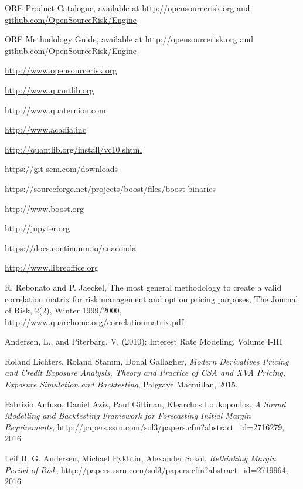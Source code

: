 \documentclass[12pt, a4paper]{article}
\begin{document}
\begin{thebibliography}{*}

 ORE Product Catalogue, available at \url{http://opensourcerisk.org} and \url{github.com/OpenSourceRisk/Engine}

 ORE Methodology Guide, available at \url{http://opensourcerisk.org} and \url{github.com/OpenSourceRisk/Engine}
  
 \url{http://www.opensourcerisk.org}

 \url{http://www.quantlib.org}
 
 \url{http://www.quaternion.com}

 \url{http://www.acadia.inc}

 \url{http://quantlib.org/install/vc10.shtml}

 \url{https://git-scm.com/downloads}

 \url{https://sourceforge.net/projects/boost/files/boost-binaries}

 \url{http://www.boost.org}

 \url{http://jupyter.org}

 \url{https://docs.continuum.io/anaconda}

 \url{http://www.libreoffice.org}

 R. Rebonato and P. Jaeckel, The most general methodology to create a valid correlation matrix for
  risk management and option pricing purposes, The Journal of Risk, 2(2), Winter 1999/2000,
  \url{http://www.quarchome.org/correlationmatrix.pdf}

 Andersen, L., and Piterbarg, V. (2010): Interest Rate Modeling, Volume I-III
  
 Roland Lichters, Roland Stamm, Donal Gallagher, {\em Modern Derivatives Pricing and Credit Exposure
    Analysis, Theory and Practice of CSA and XVA Pricing, Exposure Simulation and Backtesting}, Palgrave Macmillan,
  2015.

 Fabrizio Anfuso, Daniel Aziz, Paul Giltinan, Klearchos Loukopoulos, {\em A Sound Modelling and
    Backtesting Framework for Forecasting Initial Margin Requirements},
  \url{http://papers.ssrn.com/sol3/papers.cfm?abstract_id=2716279}, 2016

 Leif B. G. Andersen, Michael Pykhtin, Alexander Sokol, {\em Rethinking Margin Period of Risk},
  http://papers.ssrn.com/sol3/papers.cfm?abstract\_id=2719964, 2016


\end{thebibliography}
\end{document}
